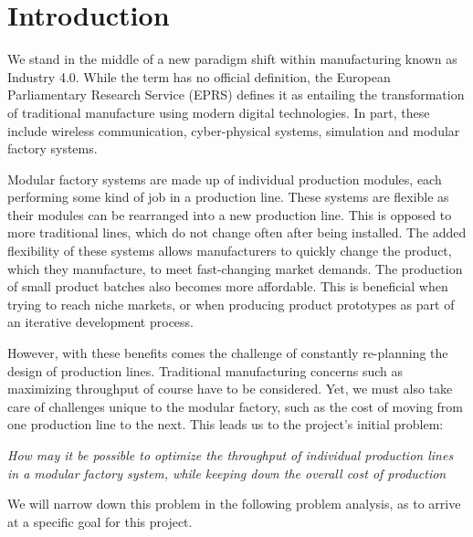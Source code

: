 \chapter{Introduction}
\label{ch:introduction}
We stand in the middle of a new paradigm shift within manufacturing known as Industry 4.0. While the term has no official definition, the European Parliamentary Research Service (EPRS)\cite{Davis2015} defines it as entailing the transformation of traditional manufacture using modern digital technologies. In part, these include wireless communication, cyber-physical systems, simulation and modular factory systems.

Modular factory systems are made up of individual production modules, each performing some kind of job in a production line. These systems are flexible as their modules can be rearranged into a new production line. This is opposed to more traditional lines, which do not change often after being installed. The added flexibility of these systems allows manufacturers to quickly change the product, which they manufacture, to meet fast-changing market demands. The production of small product batches also becomes more affordable. This is beneficial when trying to reach niche markets, or when producing product prototypes as part of an iterative development process.

However, with these benefits comes the challenge of constantly re-planning the design of production lines. Traditional manufacturing concerns such as maximizing throughput of course have to be considered. Yet, we must also take care of challenges unique to the modular factory, such as the cost of moving from one production line to the next. This leads us to the project's initial problem:

\bigskip
\textit{How may it be possible to optimize the throughput of individual production lines in a modular factory system, while keeping down the overall cost of production}
\bigskip

We will narrow down this problem in the following problem analysis, as to arrive at a specific goal for this project. 


